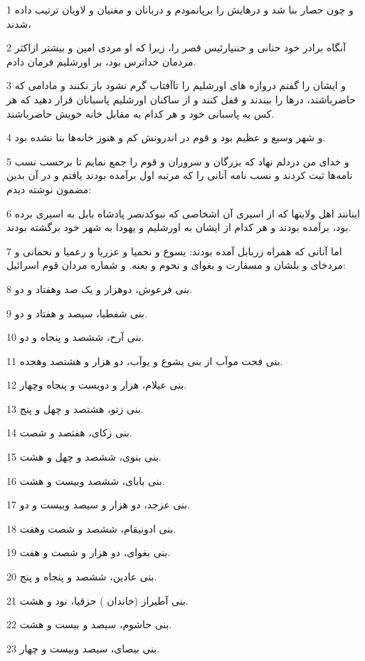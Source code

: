 \par 1 و چون حصار بنا شد و درهایش را برپانمودم و دربانان و مغنیان و لاویان ترتیب داده شدند،
\par 2 آنگاه برادر خود حنانی و حننیارئیس قصر را، زیرا که او مردی امین و بیشتر ازاکثر مردمان خداترس بود، بر اورشلیم فرمان دادم.
\par 3 و ایشان را گفتم دروازه های اورشلیم را تاآفتاب گرم نشود باز نکنند و مادامی که حاضرباشند، درها را ببندند و قفل کنند و از ساکنان اورشلیم پاسبانان قرار دهید که هر کس به پاسبانی خود و هر کدام به مقابل خانه خویش حاضرباشند.
\par 4 و شهر وسیع و عظیم بود و قوم در اندرونش کم و هنوز خانه‌ها بنا نشده بود.
\par 5 و خدای من دردلم نهاد که بزرگان و سروران و قوم را جمع نمایم تا برحسب نسب نامه‌ها ثبت کردند و نسب نامه آنانی را که مرتبه اول برآمده بودند یافتم و در آن بدین مضمون نوشته دیدم:
\par 6 اینانند اهل ولایتها که از اسیری آن اشخاصی که نبوکدنصر پادشاه بابل به اسیری برده بود، برآمده بودند و هر کدام از ایشان به اورشلیم و یهودا به شهر خود برگشته بودند.
\par 7 اما آنانی که همراه زربابل آمده بودند: یسوع و نحمیا و عزریا و رعمیا و نحمانی و مردخای و بلشان و مسفارت و بغوای و نحوم و بعنه. و شماره مردان قوم اسرائیل:
\par 8 بنی فرعوش، دوهزار و یک صد وهفتاد و دو.
\par 9 بنی شفطیا، سیصد و هفتاد و دو.
\par 10 بنی آرح، ششصد و پنجاه و دو.
\par 11 بنی فحت موآب از بنی یشوع و یوآب، دو هزار و هشتصد وهجده.
\par 12 بنی عیلام، هزار و دویست و پنجاه وچهار.
\par 13 بنی زتو، هشتصد و چهل و پنج.
\par 14 بنی زکای، هفتصد و شصت.
\par 15 بنی بنوی، ششصد و چهل و هشت.
\par 16 بنی بابای، ششصد وبیست و هشت.
\par 17 بنی عزجد، دو هزار و سیصد وبیست و دو.
\par 18 بنی ادونیقام، ششصد و شصت وهفت.
\par 19 بنی بغوای، دو هزار و شصت و هفت.
\par 20 بنی عادین، ششصد و پنجاه و پنج.
\par 21 بنی آطیراز (خاندان ) حزقیا، نود و هشت.
\par 22 بنی حاشوم، سیصد و بیست و هشت.
\par 23 بنی بیصای، سیصد وبیست و چهار.
